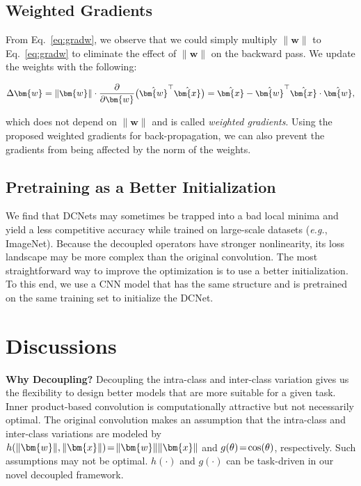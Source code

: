 \subsection{Weighted Gradients}

From Eq.~\eqref{eq:gradw}, we observe that we could simply multiply $\|\bm{w}\|$ to Eq.~\eqref{eq:gradw} to eliminate the effect of $\|\bm{w}\|$ on the backward pass. We update the weights with the following:

\begin{equation}\label{eq:gradwnew}
    \small
    \Delta \bm{w}=\left\lVert\bm{w}\right\rVert\cdot\frac{\partial}{\partial \bm{w}}\big( \hat{\bm{w}}^\top\hat{\bm{x}} \big) =
    \hat{\bm{x}} - \hat{\bm{w}}^\top\hat{\bm{x}}\cdot\hat{\bm{w}},
\end{equation}

which does not depend on $\|\bm{w}\|$ and is called \emph{weighted gradients}. Using the proposed weighted gradients for back-propagation, we can also prevent the gradients from being affected by the norm of the weights.

\subsection{Pretraining as a Better Initialization}\label{finetune}

We find that DCNets may sometimes be trapped into a bad local minima and yield a less competitive accuracy while trained on  large-scale datasets (\emph{e.g.}, ImageNet). Because the decoupled operators have stronger nonlinearity, its loss landscape may be more complex than the original convolution. The most straightforward way to improve the optimization is to use a better initialization. To this end, we use a CNN model that has the same structure and is pretrained on the same training set to initialize the DCNet.

\section{Discussions}

\textbf{Why Decoupling?} Decoupling the intra-class and inter-class variation gives us the flexibility to design better models that are more suitable for a given task. Inner product-based convolution is computationally attractive but not necessarily optimal. The original convolution makes an assumption that the intra-class and inter-class variations are modeled by $\thickmuskip=2mu \medmuskip=2mu h(\|\bm{w}\|,\|\bm{x}\|)=\|\bm{w}\|\|\bm{x}\|$ and $\thickmuskip=2mu \medmuskip=2mu g(\theta)=\cos(\theta)$, respectively. Such assumptions may not be optimal. $h(\cdot)$ and $g(\cdot)$ can be task-driven in our novel decoupled framework.
\par

